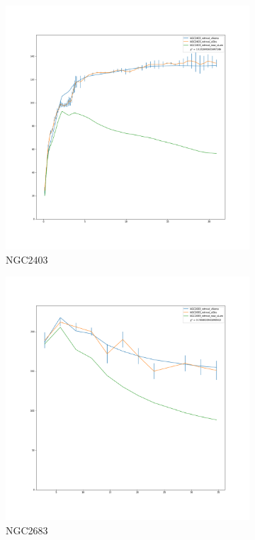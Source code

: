 \documentclass[reprint,%
 amsmath,amssymb,
 aps,
]{revtex4-1}
\begin{document}
\begin{figure}[h]
\begin{subfigure}{.5\textwidth}
  \centering
  \includegraphics[width=.8\linewidth]{figures/NGC2403_rotmod_XueSofue.png}
  \caption{NGC2403}
  \label{fig:sfig15}
\end{subfigure}
\begin{subfigure}{.5\textwidth}
  \centering
  \includegraphics[width=.8\linewidth]{figures/NGC2683_rotmod_XueSofue.png}
  \caption{NGC2683}
  \label{fig:sfig16}
\end{subfigure}
\caption{ }
\label{fig:fig2903}
\end{figure}
%
\clearpage
%
%  
\end{document}
